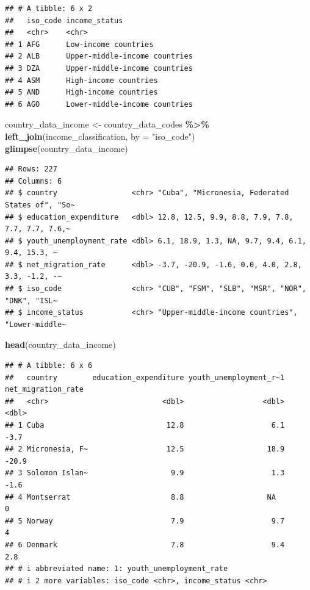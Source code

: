\documentclass[
]{article}
\newenvironment{Shaded}{\begin{snugshade}}{\end{snugshade}}
\newcommand{\AttributeTok}[1]{\textcolor[rgb]{0.13,0.29,0.53}{#1}}
\newcommand{\FunctionTok}[1]{\textcolor[rgb]{0.13,0.29,0.53}{\textbf{#1}}}
\newcommand{\NormalTok}[1]{#1}
\newcommand{\OtherTok}[1]{\textcolor[rgb]{0.56,0.35,0.01}{#1}}
\newcommand{\SpecialCharTok}[1]{\textcolor[rgb]{0.81,0.36,0.00}{\textbf{#1}}}
\newcommand{\StringTok}[1]{\textcolor[rgb]{0.31,0.60,0.02}{#1}}
\begin{document}
\begin{verbatim}
## # A tibble: 6 x 2
##   iso_code income_status                
##   <chr>    <chr>                        
## 1 AFG      Low-income countries         
## 2 ALB      Upper-middle-income countries
## 3 DZA      Upper-middle-income countries
## 4 ASM      High-income countries        
## 5 AND      High-income countries        
## 6 AGO      Lower-middle-income countries
\end{verbatim}

\begin{Shaded}
\begin{Highlighting}[]
\NormalTok{country\_data\_income }\OtherTok{\textless{}{-}}\NormalTok{ country\_data\_codes }\SpecialCharTok{\%\textgreater{}\%}
  \FunctionTok{left\_join}\NormalTok{(income\_classification, }\AttributeTok{by =} \StringTok{"iso\_code"}\NormalTok{)}
\FunctionTok{glimpse}\NormalTok{(country\_data\_income)}
\end{Highlighting}
\end{Shaded}

\begin{verbatim}
## Rows: 227
## Columns: 6
## $ country                 <chr> "Cuba", "Micronesia, Federated States of", "So~
## $ education_expenditure   <dbl> 12.8, 12.5, 9.9, 8.8, 7.9, 7.8, 7.7, 7.7, 7.6,~
## $ youth_unemployment_rate <dbl> 6.1, 18.9, 1.3, NA, 9.7, 9.4, 6.1, 9.4, 15.3, ~
## $ net_migration_rate      <dbl> -3.7, -20.9, -1.6, 0.0, 4.0, 2.8, 3.3, -1.2, -~
## $ iso_code                <chr> "CUB", "FSM", "SLB", "MSR", "NOR", "DNK", "ISL~
## $ income_status           <chr> "Upper-middle-income countries", "Lower-middle~
\end{verbatim}

\begin{Shaded}
\begin{Highlighting}[]
\FunctionTok{head}\NormalTok{(country\_data\_income)}
\end{Highlighting}
\end{Shaded}

\begin{verbatim}
## # A tibble: 6 x 6
##   country        education_expenditure youth_unemployment_r~1 net_migration_rate
##   <chr>                          <dbl>                  <dbl>              <dbl>
## 1 Cuba                            12.8                    6.1               -3.7
## 2 Micronesia, F~                  12.5                   18.9              -20.9
## 3 Solomon Islan~                   9.9                    1.3               -1.6
## 4 Montserrat                       8.8                   NA                  0  
## 5 Norway                           7.9                    9.7                4  
## 6 Denmark                          7.8                    9.4                2.8
## # i abbreviated name: 1: youth_unemployment_rate
## # i 2 more variables: iso_code <chr>, income_status <chr>
\end{verbatim}
\end{document}
